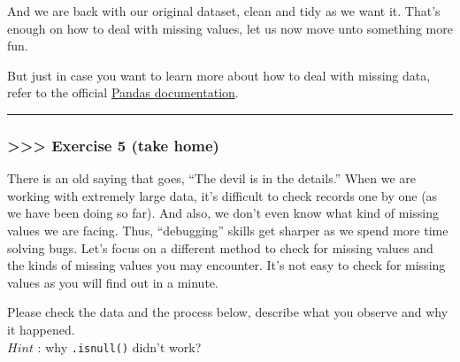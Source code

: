 \documentclass[11pt]{article}
\begin{document}
    And we are back with our original dataset, clean and tidy as we want it.
That's enough on how to deal with missing values, let us now move unto
something more fun.

    But just in case you want to learn more about how to deal with missing
data, refer to the official
\href{http://pandas.pydata.org/pandas-docs/stable/missing_data.html\#missing-data}{Pandas
documentation}.

    \begin{center}\rule{0.5\linewidth}{\linethickness}\end{center}

    \hypertarget{exercise-5-take-home}{%
\subsubsection{\texorpdfstring{\textgreater\textgreater\textgreater{}
\textbf{Exercise 5 (take
home)}}{\textgreater\textgreater\textgreater{} Exercise 5 (take home)}}\label{exercise-5-take-home}}

There is an old saying that goes, ``The devil is in the details.'' When
we are working with extremely large data, it's difficult to check
records one by one (as we have been doing so far). And also, we don't
even know what kind of missing values we are facing. Thus, ``debugging''
skills get sharper as we spend more time solving bugs. Let's focus on a
different method to check for missing values and the kinds of missing
values you may encounter. It's not easy to check for missing values as
you will find out in a minute.

Please check the data and the process below, describe what you observe
and why it happened.\\
\(Hint\) : why \texttt{.isnull()} didn't work?
\end{document}
